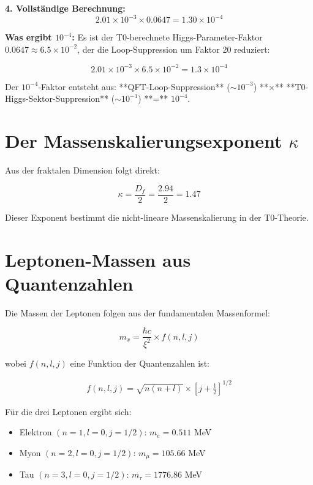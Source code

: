 \textbf{4. Vollständige Berechnung:}
\begin{equation}
	2.01 \times 10^{-3} \times 0.0647 = 1.30 \times 10^{-4}
\end{equation}

\textbf{Was ergibt $10^{-4}$:}
Es ist der T0-berechnete Higgs-Parameter-Faktor $0.0647 \approx 6.5 \times 10^{-2}$, der die Loop-Suppression um Faktor 20 reduziert:

\begin{equation}
	2.01 \times 10^{-3} \times 6.5 \times 10^{-2} = 1.3 \times 10^{-4}
\end{equation}

Der $10^{-4}$-Faktor entsteht aus: **QFT-Loop-Suppression** ($\sim 10^{-3}$) **×** **T0-Higgs-Sektor-Suppression** ($\sim 10^{-1}$) **=** $10^{-4}$.
	\section{Der Massenskalierungsexponent $\kappa$}
	
	Aus der fraktalen Dimension folgt direkt:
	
	\begin{equation}
		\kappa = \frac{D_f}{2} = \frac{2.94}{2} = 1.47
	\end{equation}
	
	Dieser Exponent bestimmt die nicht-lineare Massenskalierung in der T0-Theorie.
	
	\section{Leptonen-Massen aus Quantenzahlen}
	
	Die Massen der Leptonen folgen aus der fundamentalen Massenformel:
	
	\begin{equation}
		m_x = \frac{\hbar c}{\xi^2} \times f(n, l, j)
	\end{equation}
	
	wobei $f(n, l, j)$ eine Funktion der Quantenzahlen ist:
	
	\begin{align}
		f(n, l, j) = \sqrt{n(n+l)} \times \left[j + \frac{1}{2}\right]^{1/2}
	\end{align}
	
	Für die drei Leptonen ergibt sich:
	
	\begin{itemize}
		\item Elektron $(n=1, l=0, j=1/2)$: $m_e = 0.511$ MeV
		\item Myon $(n=2, l=0, j=1/2)$: $m_\mu = 105.66$ MeV
		\item Tau $(n=3, l=0, j=1/2)$: $m_\tau = 1776.86$ MeV
	\end{itemize}
	
